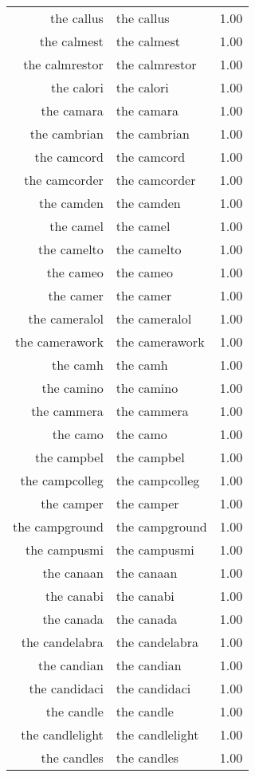 \begin{table}[ht]
\begin{tabular}{rlr}
  the callus & the callus & 1.00 \\ 
  the calmest & the calmest & 1.00 \\ 
  the calmrestor & the calmrestor & 1.00 \\ 
  the calori & the calori & 1.00 \\ 
  the camara & the camara & 1.00 \\ 
  the cambrian & the cambrian & 1.00 \\ 
  the camcord & the camcord & 1.00 \\ 
  the camcorder & the camcorder & 1.00 \\ 
  the camden & the camden & 1.00 \\ 
  the camel & the camel & 1.00 \\ 
  the camelto & the camelto & 1.00 \\ 
  the cameo & the cameo & 1.00 \\ 
  the camer & the camer & 1.00 \\ 
  the cameralol & the cameralol & 1.00 \\ 
  the camerawork & the camerawork & 1.00 \\ 
  the camh & the camh & 1.00 \\ 
  the camino & the camino & 1.00 \\ 
  the cammera & the cammera & 1.00 \\ 
  the camo & the camo & 1.00 \\ 
  the campbel & the campbel & 1.00 \\ 
  the campcolleg & the campcolleg & 1.00 \\ 
  the camper & the camper & 1.00 \\ 
  the campground & the campground & 1.00 \\ 
  the campusmi & the campusmi & 1.00 \\ 
  the canaan & the canaan & 1.00 \\ 
  the canabi & the canabi & 1.00 \\ 
  the canada & the canada & 1.00 \\ 
  the candelabra & the candelabra & 1.00 \\ 
  the candian & the candian & 1.00 \\ 
  the candidaci & the candidaci & 1.00 \\ 
  the candle & the candle & 1.00 \\ 
  the candlelight & the candlelight & 1.00 \\ 
  the candles & the candles & 1.00 \\ 

\end{tabular}
\end{table}
